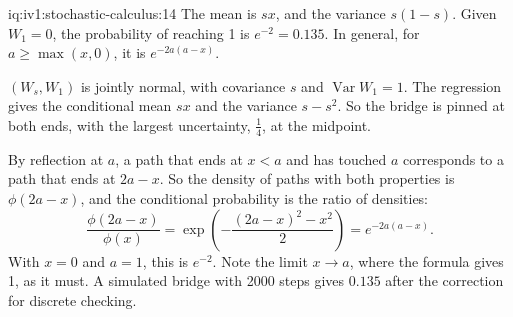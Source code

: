 \begin{solution}{iq:iv1:stochastic-calculus:14}
The mean is $sx$, and the variance $s(1 - s)$. Given $W_1 = 0$, the probability of reaching 1 is $e^{-2} = 0.135$. In general, for $a \ge \max(x, 0)$, it is $e^{-2a(a - x)}$.

$(W_s, W_1)$ is jointly normal, with covariance $s$ and $\operatorname{Var}W_1 = 1$. The regression gives the conditional mean $sx$ and the variance $s - s^2$. So the bridge is pinned at both ends, with the largest uncertainty, $\frac14$, at the midpoint.

By reflection at $a$, a path that ends at $x < a$ and has touched $a$ corresponds to a path that ends at $2a - x$. So the density of paths with both properties is $\phi(2a - x)$, and the conditional probability is the ratio of densities:
\[
\frac{\phi(2a - x)}{\phi(x)} = \exp\left(-\frac{(2a - x)^2 - x^2}{2}\right) = e^{-2a(a - x)}.
\]
With $x = 0$ and $a = 1$, this is $e^{-2}$. Note the limit $x \to a$, where the formula gives 1, as it must. A simulated bridge with 2000 steps gives $0.135$ after the correction for discrete checking.



\end{solution}

